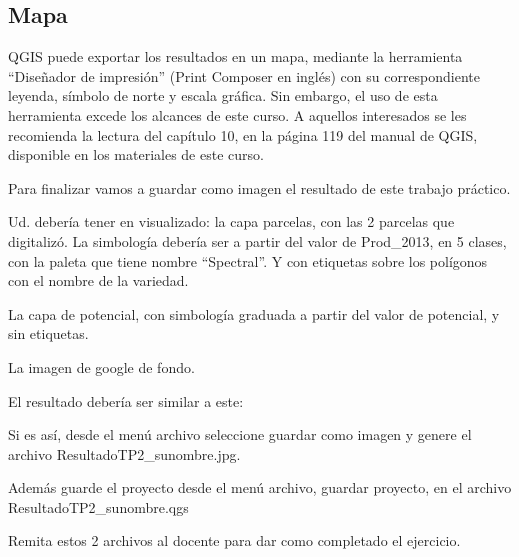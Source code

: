 \documentclass[]{article}
\begin{document}
\subsection{Mapa}

QGIS puede exportar los resultados en un mapa, mediante la herramienta “Diseñador de impresión” (Print Composer en inglés) con su correspondiente leyenda, símbolo de norte y escala gráfica. Sin embargo, el uso de esta herramienta excede los alcances de este curso. A aquellos interesados se les recomienda la lectura del capítulo 10, en la página 119 del manual de QGIS, disponible en los materiales de este curso. 

Para finalizar vamos a guardar como imagen el resultado de este trabajo práctico. 

Ud. debería tener en visualizado: la capa parcelas, con las 2 parcelas que digitalizó. La simbología debería ser a partir del valor de Prod\_2013, en 5 clases, con la paleta que tiene nombre “Spectral”. Y con etiquetas sobre los polígonos con el nombre de la variedad. 

La capa de potencial, con simbología graduada a partir del valor de potencial, y sin etiquetas.

La imagen de google de fondo.

El resultado debería ser similar a este:

Si es así, desde el menú archivo seleccione guardar como imagen y genere el archivo ResultadoTP2\_sunombre.jpg.

Además guarde el proyecto desde el menú archivo, guardar proyecto, en el archivo ResultadoTP2\_sunombre.qgs

Remita estos 2 archivos al docente para dar como completado el ejercicio. 
\end{document}
